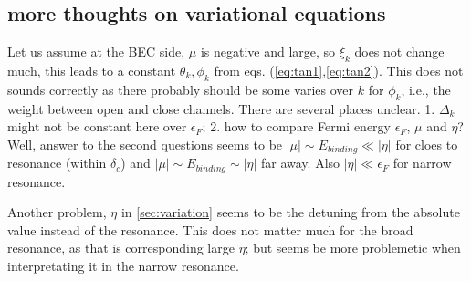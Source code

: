 \subsection{more thoughts on variational equations}
Let us assume at the BEC side, $\mu$ is negative and large, so $\xi_k$ does not change much, this leads to a constant $\theta_k,\phi_k$ from eqs. (\ref{eq:tan1},\ref{eq:tan2}).  This does not sounds correctly as there probably should be some varies over $k$ for $\phi_k$, i.e., the weight between open and close channels.  There are several places unclear.  1.  $\Delta_k$ might not be constant here over $\epsilon_F$;  2. how to compare Fermi energy $\epsilon_F$, $\mu$ and $\eta$?   Well, answer to the second questions seems to be $|\mu|\sim{}E_{binding}\ll|\eta|$ for cloes to resonance (within $\delta_c$) and $|\mu|\sim{}E_{binding}\sim|\eta|$ far away.  Also $|\eta|\ll\epsilon_F$ for narrow resonance.   


Another problem, $\eta$ in \ref{sec:variation} seems to be the detuning from the absolute value instead of the resonance.  This does not matter much for the broad resonance, as that is corresponding large $\widetilde\eta$; but seems be more problemetic when interpretating it in the narrow resonance.  